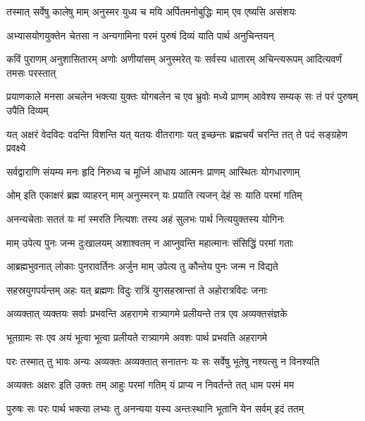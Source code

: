 \twolineshloka
{तस्मात् सर्वेषु कालेषु माम् अनुस्मर युध्य च}
{मयि अर्पितमनोबुद्धिः माम् एव एष्यसि असंशयः}%

\twolineshloka
{अभ्यासयोगयुक्तेन चेतसा न अन्यगामिना}
{परमं पुरुषं दिव्यं याति पार्थ अनुचिन्तयन्}%

\fourlineindentedshloka
{कविं पुराणम् अनुशासितारम्}
{अणोः अणीयांसम् अनुस्मरेत् यः}
{सर्वस्य धातारम् अचिन्त्यरूपम्}
{आदित्यवर्णं तमसः परस्तात्}%

\fourlineindentedshloka
{प्रयाणकाले मनसा अचलेन}
{भक्त्या युक्तः योगबलेन च एव}
{भ्रुवोः मध्ये प्राणम् आवेश्य सम्यक्}
{सः तं परं पुरुषम् उपैति दिव्यम्}%

\fourlineindentedshloka
{यत् अक्षरं वेदविदः वदन्ति}
{विशन्ति यत् यतयः वीतरागाः}
{यत् इच्छन्तः ब्रह्मचर्यं चरन्ति}
{तत् ते पदं सङ्ग्रहेण प्रवक्ष्ये}%

\twolineshloka
{सर्वद्वाराणि संयम्य मनः हृदि निरुध्य च}
{मूर्ध्नि आधाय आत्मनः प्राणम् आस्थितः योगधारणाम्}%

\twolineshloka
{ओम् इति एकाक्षरं ब्रह्म व्याहरन् माम् अनुस्मरन्}
{यः प्रयाति त्यजन् देहं सः याति परमां गतिम्}%

\twolineshloka
{अनन्यचेताः सततं यः मां स्मरति नित्यशः}
{तस्य अहं सुलभः पार्थ नित्ययुक्तस्य योगिनः}%

\twolineshloka
{माम् उपेत्य पुनः जन्म दुःखालयम् अशाश्वतम्}
{न आप्नुवन्ति महात्मानः संसिद्धिं परमां गताः}%

\twolineshloka
{आब्रह्मभुवनात् लोकाः पुनरावर्तिनः अर्जुन}
{माम् उपेत्य तु कौन्तेय पुनः जन्म न विद्यते}%

\twolineshloka
{सहस्रयुगपर्यन्तम् अहः यत् ब्रह्मणः विदुः}
{रात्रिं युगसहस्रान्तां ते अहोरात्रविदः जनाः}%

\twolineshloka
{अव्यक्तात् व्यक्तयः सर्वाः प्रभवन्ति अहरागमे}
{रात्र्यागमे प्रलीयन्ते तत्र एव अव्यक्तसंज्ञके}%

\twolineshloka
{भूतग्रामः सः एव अयं भूत्वा भूत्वा प्रलीयते}
{रात्र्यागमे अवशः पार्थ प्रभवति अहरागमे}%

\twolineshloka
{परः तस्मात् तु भावः अन्यः अव्यक्तः अव्यक्तात् सनातनः}
{यः सः सर्वेषु भूतेषु नश्यत्सु न विनश्यति}%

\twolineshloka
{अव्यक्तः अक्षरः इति उक्तः तम् आहुः परमां गतिम्}
{यं प्राप्य न निवर्तन्ते तत् धाम परमं मम}%

\twolineshloka
{पुरुषः सः परः पार्थ भक्त्या लभ्यः तु अनन्यया}
{यस्य अन्तःस्थानि भूतानि येन सर्वम् इदं ततम्}%

